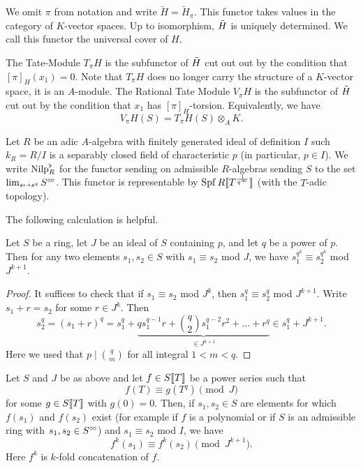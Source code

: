 \begin{defi}
  We omit $\pi$ from notation and write $\tilde H = \tilde H_\pi$. This functor
  takes values in the category of $K$-vector spaces.
  Up to isomorphism, $\Tilde H$ is uniquely determined. We call this functor
  the universal cover of $H$. 

  The Tate-Module $T_\pi H$ is the subfunctor of $\Tilde H$ cut out out
  by the condition that $[\pi]_H(x_1) = 0$. Note that $T_\pi H$ does no longer 
  carry the structure of a $K$-vector space, it is an $A$-module. The Rational
  Tate Module $V_\pi H$ is the subfunctor of $\Tilde H$ cut out by the
  condition that $x_1$ has $[\pi]_H$-torsion. Equivalently, we have 
  \begin{equation*}
    V_\pi H (S) = T_\pi H(S) \otimes_A K.
  \end{equation*}
\end{defi}

Let $R$ be an adic $A$-algebra with finitely generated ideal of definition $I$ such
$k_R = R/I$ is a separably closed field of characteristic $p$ (in particular, $p \in I$). 
We write ${\mathrm{Nilp}}^\flat_R$ for the functor sending on admissible $R$-algebras sending
$S$ to the set $\lim_{s \mapsto s^q} S^{\circ \hspace{-0.5pt} \circ}$. This functor is representable by
$\operatorname{Spf} R\llbracket T^{\frac 1{q^\infty}} \rrbracket$ (with the $T$-adic topology).

The following calculation is helpful.
\begin{lem}\label{lem:cryscalc}
  Let $S$ be a ring, let $J$ be an ideal of $S$ containing $p$, and let $q$ be
  a power of $p$. 
  Then for any two elements $s_1, s_2 \in S$ with $s_1 \equiv s_2$ mod $J$, we have 
  $s_1^{q^k} \equiv s_2^{q^k}$ mod $J^{k+1}$. 
\begin{proof}
  It suffices to check that if $s_1 \equiv s_2$ mod $J^k$, then $s_1^q \equiv s_2^q$
  mod $J^{k+1}$. Write $s_1 + r = s_2$ for some $r \in J^k$. Then 
  \begin{equation*}
    s_2^q = (s_1 + r)^q = s_1^q + \underbrace{qs_1^{q-1} r + \binom q2
    s_1^{q-2}r^2 + \dots + r^q }_{\in J^{k+1}} \in s_1^q + J^{k+1}.
  \end{equation*}
  Here we used that $p \mid \binom qm$ for all integral $1 < m < q$.
\end{proof}
\end{lem}
\begin{cor}\label{cor:crystildecalc}
  Let $S$ and $J$ be as above and let $f \in S \llbracket T \rrbracket$ be a power series such
  that 
  \begin{equation*}
    f(T) \equiv g(T^{q}) \pmod J
  \end{equation*}
  for some $g \in S\llbracket T \rrbracket$ with $g(0) = 0$. Then, if $s_1, s_2 \in S$
  are elements for which $f(s_1)$ and $f(s_2)$ exist (for example if $f$ is a
  polynomial or if $S$ is an admissible ring with $s_1, s_2 \in S^{\circ \hspace{-0.5pt} \circ}$) and
  $s_1 \equiv s_2$ mod $I$, we have
  \begin{equation*}
    f^k(s_1) \equiv f^k(s_2) \pmod {J^{k+1}}.
  \end{equation*}
  Here $f^k$ is $k$-fold concatenation of $f$. 
\end{cor}



